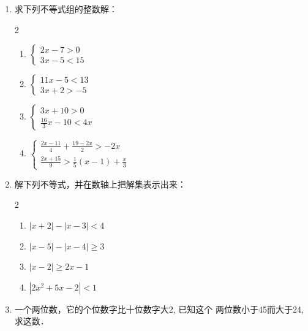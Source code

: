 \begin{enumerate}
\item 求下列不等式组的整数解：
\begin{multicols}{2}
\begin{enumerate}
    \item $\begin{cases}
        2x-7>0\\3x-5<15
    \end{cases}$
    \item $\begin{cases}
        11x-5<13\\3x+2>-5
    \end{cases}$
    \item $\begin{cases}
       3x+10>0\\ \frac{16}{3}x-10<4x
    \end{cases}$
    \item $\begin{cases}
      \frac{2x-11}{4}+\frac{19-2x}{2}>-2x\\
      \frac{2x+15}{9}>\frac{1}{5}(x-1)+\frac{x}{3}
    \end{cases}$
\end{enumerate}
\end{multicols}

\item 解下列不等式，并在数轴上把解集表示出来：
\begin{multicols}{2}
\begin{enumerate}
    \item $|x+2|-|x-3|<4$
    \item $|x-5|-|x-4|\ge 3$
    \item $|x-2|\ge 2x-1$
    \item $|2x^2+5x-2|<1$
\end{enumerate}
\end{multicols}

\item 一个两位数，它的个位数字比十位数字大2, 已知这个
两位数小于45而大于24, 求这数．


\end{enumerate}
